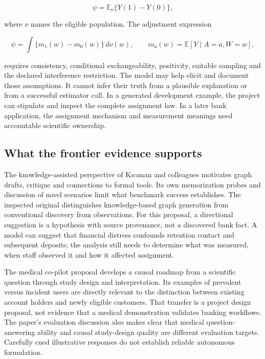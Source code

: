 \[
 \psi=\mathbb E_{\nu}\{Y(1)-Y(0)\},
\]

where \(\nu\) names the eligible population. The adjustment expression

\[
 \psi=\int\{m_1(w)-m_0(w)\}\,d\nu(w),
 \qquad m_a(w)=\mathbb E[Y\mid A=a,W=w],
\]

requires consistency, conditional exchangeability, positivity, suitable
sampling and the declared interference restriction. The model may help
elicit and document those assumptions. It cannot infer their truth from
a plausible explanation or from a successful estimator call. In a
generated development example, the project can stipulate and inspect the
complete assignment law. In a later bank application, the assignment
mechanism and measurement meanings need accountable scientific
ownership.

\hypertarget{what-the-frontier-evidence-supports}{%
\subsection{What the frontier evidence
supports}\label{what-the-frontier-evidence-supports}}

The knowledge-assisted perspective of Kıcıman and colleagues motivates
graph drafts, critique and connections to formal tools. Its own
memorization probes and discussion of novel scenarios limit what
benchmark success establishes. The inspected original distinguishes
knowledge-based graph generation from conventional discovery from
observations. For this proposal, a directional suggestion is a
hypothesis with source provenance, not a discovered bank fact. A model
can suggest that financial distress confounds retention contact and
subsequent deposits; the analysis still needs to determine what was
measured, when staff observed it and how it affected assignment.
\citep{v12_la_2305_00050}

The medical co-pilot proposal develops a causal roadmap from a
scientific question through study design and interpretation. Its
examples of prevalent versus incident users are directly relevant to the
distinction between existing account holders and newly eligible
customers. That transfer is a project design proposal, not evidence that
a medical demonstration validates banking workflows. The paper's
evaluation discussion also makes clear that medical question-answering
ability and causal study-design quality are different evaluation
targets. Carefully cued illustrative responses do not establish reliable
autonomous formulation. \citep{v12_la_2407_19118}

